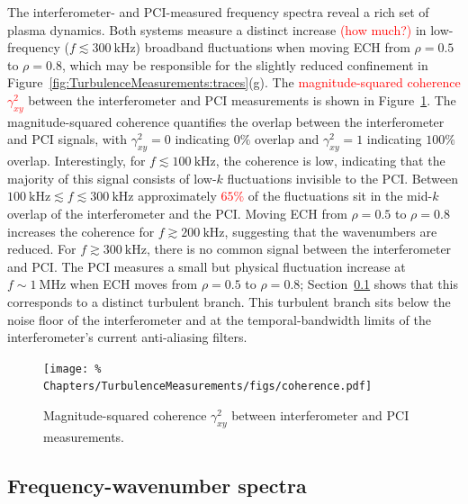 The interferometer- and PCI-measured frequency spectra
reveal a rich set of plasma dynamics.
Both systems measure a distinct increase \textcolor{red}{(how much?)}
in low-frequency ($f \lesssim \SI{300}{\kilo\hertz}$) broadband fluctuations
when moving ECH from $\rho = 0.5$ to $\rho = 0.8$,
which may be responsible for the slightly reduced confinement
in Figure~\ref{fig:TurbulenceMeasurements:traces}(g).
The \textcolor{red}{magnitude-squared coherence $\gamma^2_{xy}$}
between the interferometer and PCI measurements
is shown in Figure~\ref{fig:TurbulenceMeasurements:gamma2xy}.
The magnitude-squared coherence quantifies
the overlap between the interferometer and PCI signals,
with $\gamma^2_{xy} = 0$ indicating $0\%$ overlap and
$\gamma^2_{xy} = 1$ indicating $100\%$ overlap.
Interestingly, for $f \lesssim \SI{100}{\kilo\hertz}$,
the coherence is low,
indicating that the majority of this signal
consists of low-$k$ fluctuations invisible to the PCI.
Between $\SI{100}{\kilo\hertz} \lesssim f \lesssim \SI{300}{\kilo\hertz}$
approximately \textcolor{red}{$65\%$}
of the fluctuations sit in the mid-$k$ overlap
of the interferometer and the PCI.
\graffito{\textcolor{red}{better explanation}}
Moving ECH from $\rho = 0.5$ to $\rho = 0.8$
increases the coherence for $f \gtrsim \SI{200}{\kilo\hertz}$,
suggesting that the wavenumbers are reduced.
For $f \gtrsim \SI{300}{\kilo\hertz}$,
there is no common signal between the interferometer and PCI.
The PCI measures a small but physical fluctuation increase
at $f \sim \SI{1}{\mega\hertz}$
when ECH moves from $\rho = 0.5$ to $\rho = 0.8$;
Section~\ref{sec:TurbulenceMeasurements:Skf}
shows that this corresponds to a distinct turbulent branch.
This turbulent branch sits
below the noise floor of the interferometer and
at the temporal-bandwidth limits of the interferometer's
current anti-aliasing filters.

\begin{figure}
  \centering
  \texttt{[image: \%
    Chapters/TurbulenceMeasurements/figs/coherence.pdf]}
  \caption[Magnitude-squared coherence]{%
    Magnitude-squared coherence $\gamma^2_{xy}$
    between interferometer and PCI measurements.
  }
  \label{fig:TurbulenceMeasurements:gamma2xy}
\end{figure}


\subsection{Frequency-wavenumber spectra}
\label{sec:TurbulenceMeasurements:Skf}

